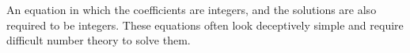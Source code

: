 An equation in which the coefficients are integers, and
the solutions are also required to be integers. These equations
often look deceptively simple and require difficult number theory
to solve them.